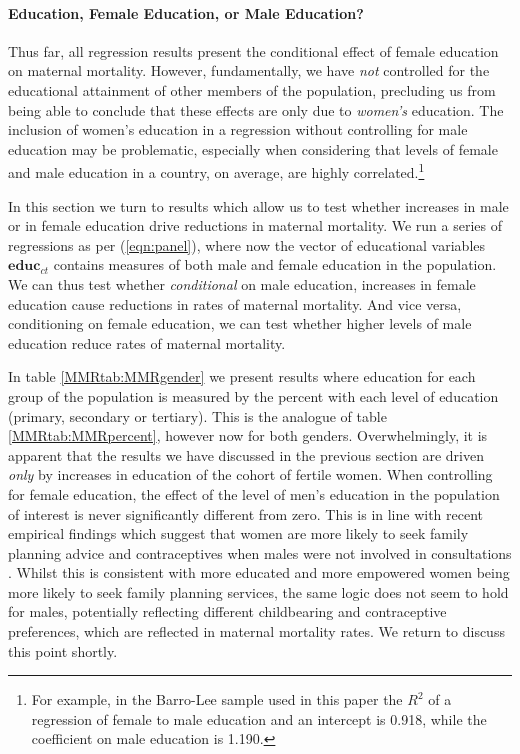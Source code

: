 \documentclass{article}[12pt,subeqn]
\begin{document}
\begin{spacing}{1.4}
\paragraph{Education, Female Education, or Male Education?}
\label{ssscn:gender}
Thus far, all regression results present the conditional effect of female 
education on maternal mortality.  However, fundamentally, we have \emph{not} 
controlled for the educational attainment of other members of the population, 
precluding us from being able to conclude that these effects are only due to 
\emph{women's} education.  The inclusion of women's education in a regression 
without controlling for male education may be problematic, especially when 
considering that levels of female and male education in a country, on average, 
are highly correlated.\footnote{For example, in the Barro-Lee sample used in this 
paper the $R^2$ of a regression of female to male education and an intercept is 
0.918, while the coefficient on male education is 1.190.}

In this section we turn to results which allow us to test whether increases 
in male or in female education drive reductions in maternal mortality.  We
run a series of regressions as per (\ref{eqn:panel}), where now the vector
of educational variables $\mathbf{educ}_{ct}$ contains measures of both male
and female education in the population.  We can thus test whether 
\emph{conditional} on male education, increases in female education cause
reductions in rates of maternal mortality.  And vice versa, conditioning on
female education, we can test whether higher levels of male education reduce
rates of maternal mortality.

In table \ref{MMRtab:MMRgender} we present results where education for each 
group of the population is measured by the percent with each level of 
education (primary, secondary or tertiary).  This is the analogue of table
\ref{MMRtab:MMRpercent}, however now for both genders.  Overwhelmingly, it is
apparent that the results we have discussed in the previous section are driven
\emph{only} by increases in education of the cohort of fertile women.  When
controlling for female education, the effect of the level of men's education in
the population of interest is never significantly different from
zero.  This is in line with recent empirical findings which suggest
that women are more likely to seek family planning advice and
contraceptives when males were not involved in consultations
\citet{Ashrafetal2014}.  Whilst this is consistent with more educated
and more empowered women being more likely to seek family planning
services, the same logic does not seem to hold for males, potentially
reflecting different childbearing and contraceptive preferences,
which are reflected in maternal mortality rates.  We return to discuss this
point shortly.


\end{spacing}
\end{document}
